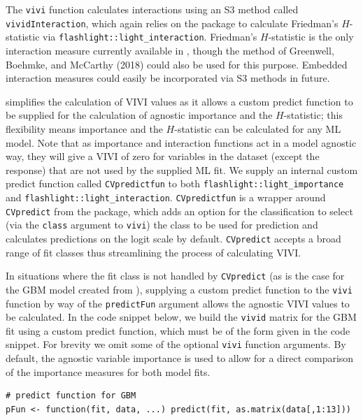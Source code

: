 The \texttt{vivi} function calculates interactions using an S3 method called \texttt{vividInteraction}, which again relies on the  package to calculate Friedman's \(H\)-statistic via
\texttt{flashlight::light\_interaction}. Friedman's \(H\)-statistic is the only interaction measure currently available in , though the method of Greenwell, Boehmke, and McCarthy (2018) could also be used for this purpose. Embedded interaction measures could easily be incorporated via S3 methods in future.

 simplifies the calculation of VIVI values
as it allows a custom predict function to be supplied for the calculation of agnostic importance and the \(H\)-statistic; this flexibility means importance and the \(H\)-statistic can be calculated for any ML model. Note that as  importance and interaction functions act in a model agnostic way, they will give a VIVI of zero for variables in the dataset (except the response) that are not used by the supplied ML fit.
We supply an internal custom predict function called \texttt{CVpredictfun} to both \texttt{flashlight::light\_importance} and \texttt{flashlight::light\_interaction}. \texttt{CVpredictfun} is a wrapper around \texttt{CVpredict} from the  package, which adds an option for the classification to select (via the \texttt{class} argument to \texttt{vivi}) the class to be used for prediction and calculates predictions on the logit scale by default.
\texttt{CVpredict} accepts a broad range of fit classes thus streamlining the process of calculating VIVI.

In situations where the fit class is not handled by \texttt{CVpredict} (as is the case for the GBM model created from ), supplying a custom predict function to the \texttt{vivi} function by way of the \texttt{predictFun} argument allows the agnostic VIVI values to be calculated.
In the code snippet below, we build the \texttt{vivid} matrix for the GBM fit using a custom predict function, which must be of the form given in the code snippet.
For brevity we omit some of the optional \texttt{vivi} function arguments. By default, the agnostic variable importance is used to allow for a direct comparison of the importance measures for both model fits.

\begin{verbatim}
# predict function for GBM
pFun <- function(fit, data, ...) predict(fit, as.matrix(data[,1:13]))
\end{verbatim}

